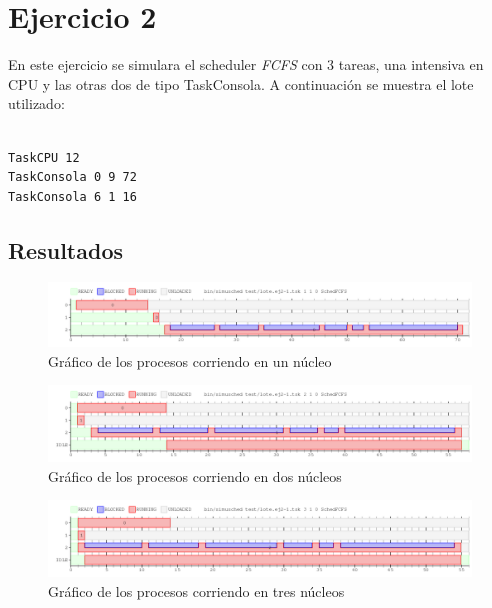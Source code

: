 \documentclass[a4paper]{article}
\begin{document}
\section{Ejercicio 2}
En este ejercicio se simulara el scheduler \textit{FCFS} con 3 tareas, una 
intensiva en CPU y las otras dos de tipo TaskConsola. A continuación se
muestra el lote utilizado:
\begin{verbatim}

TaskCPU 12
TaskConsola 0 9 72
TaskConsola 6 1 16

\end{verbatim}

\subsection{Resultados}

\begin{figure}[htb]
\begin{center}
\includegraphics[scale=0.4]{imagenes/ej2-1-c-1.png}
\end{center}
\caption{Gráfico de los procesos corriendo en un núcleo}
\end{figure}

\begin{figure}[htb]
\begin{center}
\includegraphics[scale=0.4]{imagenes/ej2-1-c-2.png}
\end{center}
\caption{Gráfico de los procesos corriendo en dos núcleos}
\end{figure}

\begin{figure}[htb]
\begin{center}
\includegraphics[scale=0.4]{imagenes/ej2-1-c-3.png}
\end{center}
\caption{Gráfico de los procesos corriendo en tres núcleos}
\end{figure}
\end{document}
